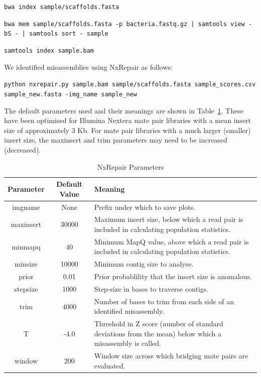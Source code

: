 \documentclass[fleqn,10pt]{wlpeerj}
\begin{document}
\texttt{bwa index sample/scaffolds.fasta}

\texttt{bwa mem sample/scaffolds.fasta -p bacteria.fastq.gz | samtools view -bS - |  samtools sort - sample}

\texttt{samtools index sample.bam}

We identified misassemblies using NxRepair as follows:

\texttt{python nxrepair.py sample.bam   sample/scaffolds.fasta sample\_scores.csv  sample\_new.fasta -img\_name sample\_new}


The default parameters used and their meanings are shown in Table~\ref{tab:parameters}. These have been optimised for Illumina Nextera mate pair libraries with a mean insert size of approximately 3 Kb. For mate pair libraries with a much larger (smaller) insert size, the maxinsert and trim parameters may need to be increased (decreased).

\begin{table}
\begin{center}
\begin{tabular}{|c|c|p{8cm}|}
    \hline
    Parameter & Default Value & Meaning \\ \hline
    imgname & None & Prefix under which to save plots. \\
    maxinsert & 30000 &  Maximum insert size, below which a read pair is included in calculating population statistics.\\
    minmapq & 40 & Minimum MapQ value, above which a read pair is included in calculating population statistics.\\
    minsize & 10000 & Minimum contig size to analyse.\\ 
    prior & 0.01 & Prior probablility that the insert size is anomalous.\\
    stepsize & 1000 & Step-size in bases to traverse contigs.\\
    trim & 4000 & Number of bases to trim from each side of an identified misassembly.\\
    T & -4.0 & Threshold in Z score (number of standard deviations from the mean) below which a misassembly is called.\\
    window & 200 & Window size across which bridging mate pairs are evaluated.\\ \hline
\end{tabular}
\end{center}
\caption{NxRepair Parameters \label{tab:parameters}}
\end{table}
\end{document}
